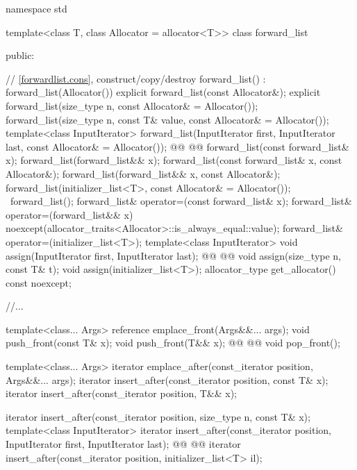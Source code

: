 \documentclass{wg21}
\begin{document}
\begin{codeblock}
namespace std {
    template<class T, class Allocator = allocator<T>>
    class forward_list {
        public:

        // \ref{forwardlist.cons}, construct/copy/destroy
        forward_list() : forward_list(Allocator()) { }
        explicit forward_list(const Allocator&);
        explicit forward_list(size_type n, const Allocator& = Allocator());
        forward_list(size_type n, const T& value, const Allocator& = Allocator());
        template<class InputIterator>
        forward_list(InputIterator first, InputIterator last, const Allocator& = Allocator());
        @@
        @@
        forward_list(const forward_list& x);
        forward_list(forward_list&& x);
        forward_list(const forward_list& x, const Allocator&);
        forward_list(forward_list&& x, const Allocator&);
        forward_list(initializer_list<T>, const Allocator& = Allocator());
        ~forward_list();
        forward_list& operator=(const forward_list& x);
        forward_list& operator=(forward_list&& x)
        noexcept(allocator_traits<Allocator>::is_always_equal::value);
        forward_list& operator=(initializer_list<T>);
        template<class InputIterator>
        void assign(InputIterator first, InputIterator last);
        @@
        @@
        void assign(size_type n, const T& t);
        void assign(initializer_list<T>);
        allocator_type get_allocator() const noexcept;

        //...

        template<class... Args> reference emplace_front(Args&&... args);
        void push_front(const T& x);
        void push_front(T&& x);
        @@
        @@
        void pop_front();

        template<class... Args> iterator emplace_after(const_iterator position, Args&&... args);
        iterator insert_after(const_iterator position, const T& x);
        iterator insert_after(const_iterator position, T&& x);

        iterator insert_after(const_iterator position, size_type n, const T& x);
        template<class InputIterator>
        iterator insert_after(const_iterator position, InputIterator first, InputIterator last);
        @@
        @@
        iterator insert_after(const_iterator position, initializer_list<T> il);

}}
\end{codeblock}
\end{document}
